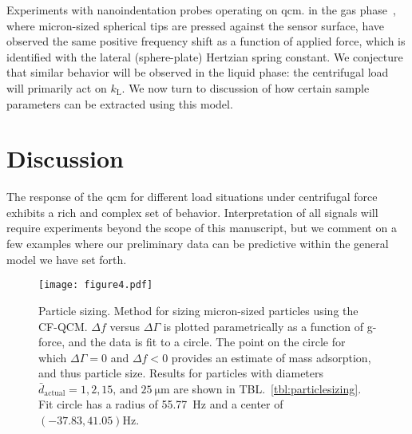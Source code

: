 \documentclass[floatfix,superscriptaddress,a4paper,twocolumn]{revtex4-1}
\newcommand{\Table}[1]{TBL.~\ref{#1}}
\newcommand{\df}{\Delta\!f}
\newcommand{\dg}{\Delta\Gamma}
\newcommand{\kl}{k_\mathrm{L}}
\begin{document}

Experiments with nanoindentation probes operating on \gls{qcm}. in the gas
phase~\cite{borovsky2001measuring}, where micron-sized spherical tips are
pressed against the sensor surface, have observed the same positive
frequency shift as a function of applied force,  which is identified with
the lateral (sphere-plate) Hertzian spring constant.  We conjecture that
similar behavior will be observed in the liquid phase: the centrifugal load
will primarily act on $\kl$.  We now turn to discussion of how certain
sample parameters can be extracted using this model.

\section*{Discussion}
\label{sec:discussion}
The response of the \gls{qcm} for different load situations under centrifugal
force exhibits a rich and complex set of behavior. Interpretation of all
signals will require experiments beyond the scope of this
manuscript, but we comment on a few examples where our
preliminary data can be predictive within the general model we have set forth.

\begin{figure}[ht]
  \centering
  \texttt{[image: figure4.pdf]}
  \caption{ Particle sizing.  Method for sizing micron-sized particles using the CF-QCM.
    $\df$ versus $\dg$ is plotted parametrically as a function of g-force, and
    the data is fit to a circle.  The point on the circle for which $\dg=0$ and
    $\df<0$ provides an estimate of mass adsorption, and thus particle size.
    Results for particles with diameters $\bar{d}_\mathrm{actual}=1, 2,
      15,\,\mathrm{and}\;\SI{25}{\micro\meter}$ are shown in
    \Table{tbl:particlesizing}.  Fit circle has a radius of \SI{55.77}{\hertz} and
    a center of $(-37.83,41.05) \si{\hertz}$. }
  \label{fig:circlefit}
\end{figure}
\end{document}
